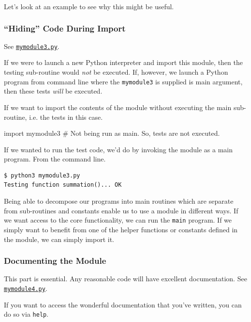 \documentclass[12pt,letterpaper,twoside]{article}
\begin{document}
\begin{enumerate}
Let's look at an example to see why this might be useful.

\subsubsection{``Hiding'' Code During Import}

See 
\href{https://github.com/CME211/notes/blob/fall_18/lecture-05/mymodule3.py}
{\texttt{mymodule3.py}}.



If we were to launch a new Python interpreter and import this module,
then the testing sub-routine would \emph{not} be executed. If, however, we launch
a Python program from command line where the \texttt{mymodule3} is supplied is main argument,
then these tests \emph{will} be executed.

If we want to import the contents of the module without executing the main sub-routine, i.e.
the tests in this case.

\begin{python}
import mymodule3    # Not being run as main. So, tests are not executed.
\end{python}

If we wanted to run the test code, we'd do by invoking the module as a main program.
From the command line.

\begin{verbatim}
$ python3 mymodule3.py
Testing function summation()... OK
\end{verbatim}

Being able to decompose our programs into main routines which are separate from sub-routines
and constants enable us to use a module in different ways. If we want access to the core 
functionality, we can run the \texttt{main} program. If we simply want to benefit from
one of the helper functions or constants defined in the module, we can simply
import it.

\subsubsection{Documenting the Module}
This part is essential. Any reasonable code will have excellent documentation.
See 
\href{https://github.com/CME211/notes/blob/fall_18/lecture-05/mymodule4.py}{\texttt{mymodule4.py}}.



If you want to access the wonderful documentation that you've written, you can do so via 
\texttt{help}.


\end{enumerate}
\end{document}
